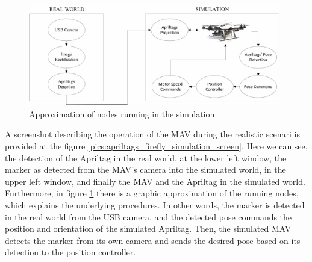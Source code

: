\begin{figure}
   \centering
   \includegraphics[width=0.98\textwidth]{images/cam_firefly_sim.pdf}
   \caption{Approximation of nodes running in the simulation \protect\footnotemark }
   \label{pics:mav_demo_camera_rosgraph}
\end{figure}

A screenshot describing the operation of the MAV during the realistic scenari is provided at the figure \ref{pics:apriltags_firefly_simulation_screen}. Here we can see, the detection of the Apriltag in the real world, at the lower left window, the marker as detected from the MAV's camera into the simulated world, in the upper left window, and finally the MAV and the Apriltag in the simulated world. Furthermore, in figure \ref{pics:mav_demo_camera_rosgraph} there is a graphic approximation of the running nodes, which explains the underlying procedures. In other words, the marker is detected in the real world from the USB camera, and the detected pose commands the position and orientation of the simulated Apriltag. Then, the simulated MAV detects the marker from its own camera and sends the desired pose based on its detection to the position controller. 

